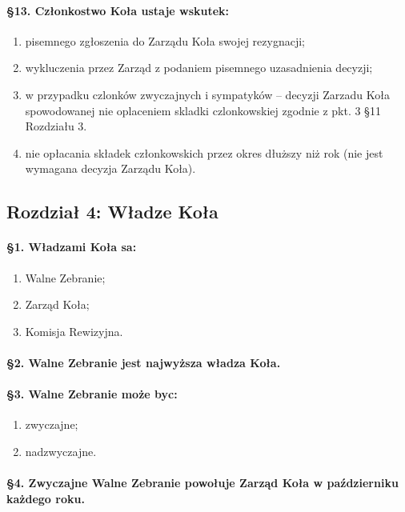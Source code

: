 \documentclass{article}
\begin{document}
\paragraph{\S 13. Członkostwo Koła ustaje wskutek:}
		\begin{enumerate}
			\item pisemnego zgłoszenia do Zarządu Koła swojej rezygnacji;
			\item wykluczenia przez Zarząd z podaniem pisemnego uzasadnienia decyzji;
			\item w przypadku czlonków zwyczajnych i sympatyków – decyzji Zarzadu Koła spowodowanej nie oplaceniem skladki czlonkowskiej
			zgodnie z pkt. 3 §11 Rozdziału 3.
			\item nie opłacania składek członkowskich przez okres dłuższy niż rok (nie jest wymagana decyzja Zarządu Koła). 
		\end{enumerate}

\vspace{0.4cm}
\begin{center}
    \section*{Rozdział 4: Władze Koła}
\end{center}\vspace{0.4cm}
		\paragraph{\S 1. Władzami Koła sa:}
		\begin{enumerate}
			\item Walne Zebranie;
			\item Zarząd Koła;
			\item Komisja Rewizyjna.
		\end{enumerate}
		\paragraph{\S 2. Walne Zebranie jest najwyższa władza Koła.}
		\paragraph{\S 3. Walne Zebranie może byc:}
		\begin{enumerate}
			\item zwyczajne;
			\item nadzwyczajne.
		\end{enumerate}
		\paragraph{\S 4. Zwyczajne Walne Zebranie powołuje Zarząd Koła w październiku każdego roku.}
\end{document}
